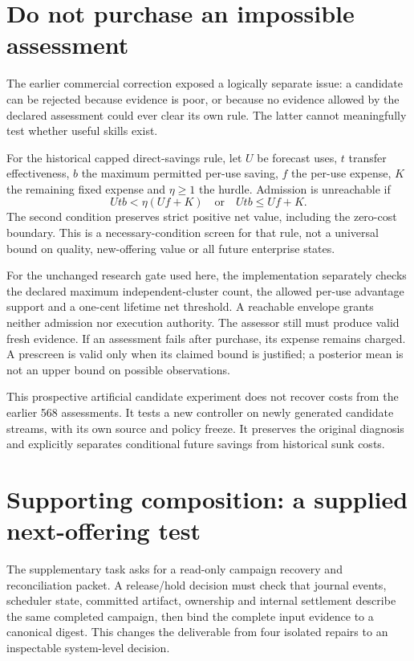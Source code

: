 \documentclass[11pt,letterpaper]{article}
\begin{document}
\section{Do not purchase an impossible assessment}
The earlier commercial correction exposed a logically separate issue: a candidate can be rejected because evidence is poor, or because no evidence allowed by the declared assessment could ever clear its own rule. The latter cannot meaningfully test whether useful skills exist.

For the historical capped direct-savings rule, let $U$ be forecast uses, $t$ transfer effectiveness, $b$ the maximum permitted per-use saving, $f$ the per-use expense, $K$ the remaining fixed expense and $\eta\geq1$ the hurdle. Admission is unreachable if
\[
Utb < \eta(Uf+K)\quad\text{or}\quad Utb\leq Uf+K.
\]
The second condition preserves strict positive net value, including the zero-cost boundary. This is a necessary-condition screen for that rule, not a universal bound on quality, new-offering value or all future enterprise states.

For the unchanged research gate used here, the implementation separately checks the declared maximum independent-cluster count, the allowed per-use advantage support and a one-cent lifetime net threshold. A reachable envelope grants neither admission nor execution authority. The assessor still must produce valid fresh evidence. If an assessment fails after purchase, its expense remains charged. A prescreen is valid only when its claimed bound is justified; a posterior mean is not an upper bound on possible observations.



This prospective artificial candidate experiment does not recover costs from the earlier 568 assessments. It tests a new controller on newly generated candidate streams, with its own source and policy freeze. It preserves the original diagnosis and explicitly separates conditional future savings from historical sunk costs.

\section{Supporting composition: a supplied next-offering test}
The supplementary task asks for a read-only campaign recovery and reconciliation packet. A release/hold decision must check that journal events, scheduler state, committed artifact, ownership and internal settlement describe the same completed campaign, then bind the complete input evidence to a canonical digest. This changes the deliverable from four isolated repairs to an inspectable system-level decision.
\end{document}
